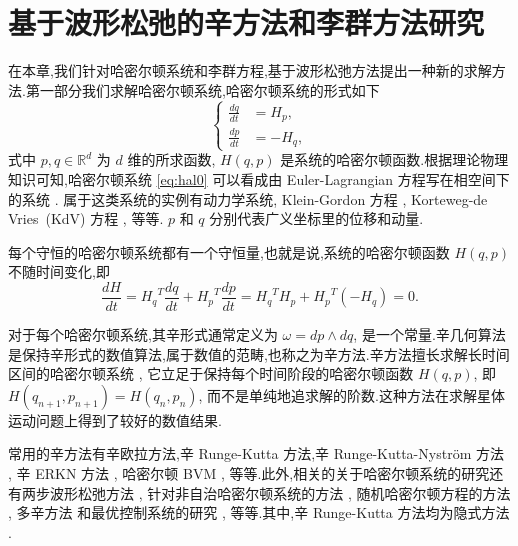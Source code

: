 \chapter{基于波形松弛的辛方法和李群方法研究}

在本章,我们针对哈密尔顿系统和李群方程,基于波形松弛方法提出一种新的求解方法.第一部分我们求解哈密尔顿系统,哈密尔顿系统的形式如下
\begin{equation}\label{eq:hal0}
  \left\lbrace
    \begin{aligned}
      \frac{dq}{dt}&=H_p,\\
      \frac{dp}{dt}&=-H_q,
    \end{aligned}
  \right.
\end{equation}
式中 $p,q \in \mathbb{R}^d$ 为 $d$ 维的所求函数, $H(q,p)$ 是系统的哈密尔顿函数.根据理论物理知识可知,哈密尔顿系统 \eqref{eq:hal0} 可以看成由 Euler-Lagrangian 方程写在相空间下的系统 \cite{frankel2011geometry}. 属于这类系统的实例有动力学系统, Klein-Gordon 方程 \cite{nakanishi2011global}, Korteweg-de Vries~(KdV) 方程 \cite{abdalla2012three}, 等等. $p$ 和 $q$ 分别代表广义坐标里的位移和动量.

每个守恒的哈密尔顿系统都有一个守恒量,也就是说,系统的哈密尔顿函数 $H(q,p)$ 不随时间变化,即
\begin{equation*}
  \frac{dH}{dt}={H_q}^T\frac{dq}{dt}+{H_p}^T\frac{dp}{dt}={H_q}^TH_p+{H_p}^T(-H_q)=0.
\end{equation*}

对于每个哈密尔顿系统,其辛形式通常定义为 $\omega = dp \wedge dq$, 是一个常量.辛几何算法是保持辛形式的数值算法,属于数值的范畴,也称之为辛方法.辛方法擅长求解长时间区间的哈密尔顿系统 \cite{feng2010symplectic,hairer2006geometric}, 它立足于保持每个时间阶段的哈密尔顿函数  $H(q,p)$, 即 $H(q_{n+1},p_{n+1})=H(q_n,p_n)$, 而不是单纯地追求解的阶数.这种方法在求解星体运动问题上得到了较好的数值结果.

常用的辛方法有辛欧拉方法,辛 Runge-Kutta 方法,辛 Runge-Kutta-Nystr{\"o}m 方法 \cite{kalogiratou2014fourth,kalogiratou2015}, 辛 ERKN 方法 \cite{wang2014ahigh}, 哈密尔顿 BVM \cite{brugnano2014multi}, 等等.此外,相关的关于哈密尔顿系统的研究还有两步波形松弛方法 \cite{hassanzadeh2014two}, 针对非自治哈密尔顿系统的方法 \cite{hong2000numerical,zhang2010anote}, 随机哈密尔顿方程的方法 \cite{burrage2014structure,ma2015sto,fan2015using}, 多辛方法 \cite{wang2013multi} 和最优控制系统的研究 \cite{li2015asym}, 等等.其中,辛 Runge-Kutta 方法均为隐式方法 \cite{sanz1988runge}.

